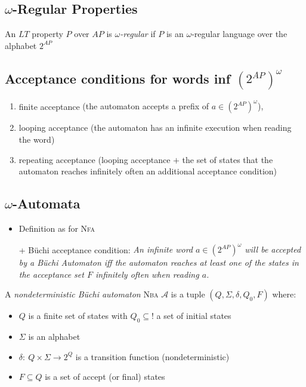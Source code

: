 \documentclass[a4paper, 10pt]{article}
\begin{document}
\subsection*{$\omega$-Regular Properties}
\begin{shaded}
        An $LT$ property $P$ over $AP$ is \emph{$\omega$-regular} if $P$ is an $\omega$-regular language over the alphabet $2^{AP}$
\end{shaded}

\subsection*{Acceptance conditions for words inf $(2^{AP})^\omega$}
\begin{enumerate}
    \item finite acceptance {\tiny (the automaton accepts a prefix of $a\in(2^{AP})^\omega$), }
    \item looping acceptance {\tiny (the automaton has an infinite execution when reading the word) }
    \item repeating acceptance {\tiny (looping acceptance $+$ the set of states that the automaton reaches infinitely often an additional acceptance condition) }
\end{enumerate}

\subsection*{$\omega$-Automata}
\begin{itemize}
    \item Definition as for \textsc{Nfa}
    \item[+] Büchi acceptance condition: \emph{An infinite word $a\in(2^{AP})^\omega$ will be accepted by a Büchi Automaton iff the automaton reaches at least one of the states in the acceptance set $F$ infinitely often when reading $a$.}
\end{itemize}
\begin{shaded}
    A \emph{nondeterministic Büchi automaton} \textsc{Nba} $\mathcal{A}$ is a tuple $(Q,\Sigma,\delta,Q_0,F)$ where:
    \begin{itemize}
        \item $Q$ is a finite set of states with $Q_0\subseteq !$ a set of initial states
        \item $\Sigma$ is an alphabet
        \item $\delta:\ Q\times\Sigma\to2^Q$ is a transition function {\tiny (nondeterministic)}
        \item $F\subseteq Q$ is a set of accept (or final) states
    \end{itemize}
\end{shaded}
\end{document}
